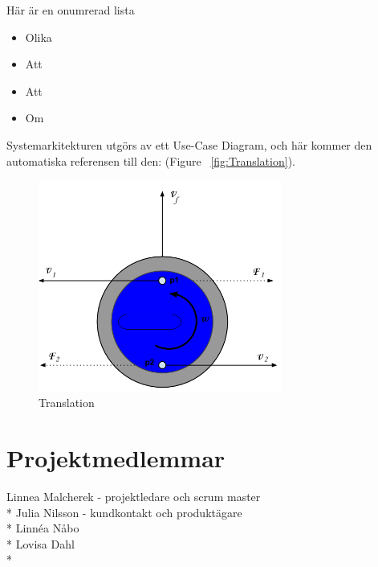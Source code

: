 \documentclass[11pt]{article} %
\begin{document}
Här är en onumrerad lista
\begin{itemize}
\item Olika
\item Att 
\item Att
\item Om 
\end{itemize}



Systemarkitekturen utgörs av ett Use-Case Diagram, och här kommer den automatiska referensen till den:   (Figure ~\ref{fig:Translation}).

\begin{figure}[ht!]
\centering
\includegraphics[width=80mm]{Translation.png}
\caption{Translation}
\label{fig:Translation}
\label{overflow}
\end{figure}


\pagebreak


\section{Projektmedlemmar}

Linnea Malcherek - projektledare och scrum master\\*
Julia Nilsson - kundkontakt och produktägare\\*
Linnéa Nåbo \\*
Lovisa Dahl\\*
\end{document}
